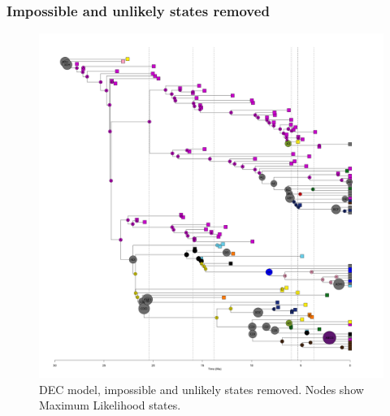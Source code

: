 \documentclass[a4paper, 12pt]{article}
\begin{document}

\subsubsection{Impossible and unlikely states removed}

\begin{figure}[H]
 \centering
  \includegraphics[width = \linewidth]{figures/all-pinnipeds-DEC-unlikely-MLstates.png}
  \caption{DEC model, impossible and unlikely states removed. Nodes show Maximum Likelihood states.}
  \label{fig-all-dec-ml-unlikely}
\end{figure} 
\end{document}
